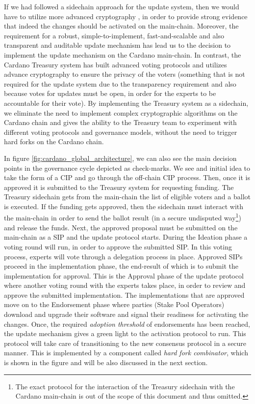 If we had followed a sidechain approach for the 
update system, then we would have to utilize more advanced cryptography 
\cite{possidechains}, in order to provide strong evidence that indeed the 
changes should be activated on the main-chain. Moreover, the requirement for a 
robust, simple-to-implement, fast-and-scalable and also transparent and 
auditable update mechanism has lead us to the decision to implement the update 
mechanism on the Cardano main-chain. In contrast, the Cardano Treasury system 
has built advanced voting protocols and utilizes advance cryptography to ensure 
the privacy of the voters (something that is not required for the update system 
due to the transparency requirement and also because votes for 
updates must be open, in order for the experts to be accountable for their 
vote). By implementing the Treasury system as a sidechain, 
we eliminate the need to implement complex cryptographic algorithms on the 
Cardano chain and gives the ability to the Treasury team to experiment with 
different voting protocols and governance models, without the need to trigger 
hard forks on the Cardano chain.

In figure \ref{fig:cardano_global_architecture}, we can also see the main 
decision points in the governance cycle depicted as check-marks. We see and 
initial idea to take the form of a CIP and go through the off-chain CIP 
process. Then, once it is approved it is submitted to the Treasury system for 
requesting funding. The Treasury sidechain gets from the main-chain the list of 
eligible voters and a ballot is executed. If the funding gets approved, then 
the sidechain must interact with the main-chain in order to send the ballot 
result (in a secure undisputed way\footnote{The exact protocol for the 
	interaction of the Treasury sidechain with the Cardano main-chain is out of 
	the 
	scope of this document and thus omitted.}) and release the funds. Next, the 
approved 
proposal must be submitted on 
the main-chain as a SIP and the update protocol starts. During the Ideation 
phase a voting round will run, in order to approve the submitted SIP. In this 
voting process, experts will vote through a delegation process in place. 
Approved SIPs proceed in the implementation phase, the end-result of which is 
to submit the implementation for approval. This is the Approval phase of the 
update protocol where another voting round with the experts takes place, in 
order to review and approve the submitted implementation. The implementations 
that are approved move on to the Endorsement phase where parties (Stake Pool 
Operators) download and upgrade their software and signal their readiness for 
activating the changes. Once, the required \emph{adoption threshold} of 
endorsements has been reached, the update mechanism gives a green light to the 
activation protocol to run. This protocol will take care of transitioning to 
the new consensus protocol in a secure manner. This is 
implemented by a component called \emph{hard fork combinator}, which is shown 
in the figure and will be also discussed in the next section.

